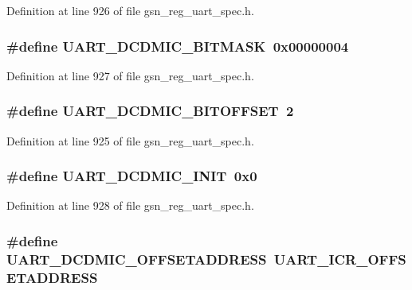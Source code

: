 Definition at line 926 of file gsn\_\-reg\_\-uart\_\-spec.h.

\hypertarget{a00575_aaee55abd39937707a37a6a304b7748fd}{
\subsubsection[{UART\_\-DCDMIC\_\-BITMASK}]{\setlength{\rightskip}{0pt plus 5cm}\#define UART\_\-DCDMIC\_\-BITMASK~0x00000004}}
\label{a00575_aaee55abd39937707a37a6a304b7748fd}


Definition at line 927 of file gsn\_\-reg\_\-uart\_\-spec.h.

\hypertarget{a00575_a1347a66d096cfc867a9771137c5c56b4}{
\subsubsection[{UART\_\-DCDMIC\_\-BITOFFSET}]{\setlength{\rightskip}{0pt plus 5cm}\#define UART\_\-DCDMIC\_\-BITOFFSET~2}}
\label{a00575_a1347a66d096cfc867a9771137c5c56b4}


Definition at line 925 of file gsn\_\-reg\_\-uart\_\-spec.h.

\hypertarget{a00575_a82d1a36e4570cdfd32fee2c5029bfda8}{
\subsubsection[{UART\_\-DCDMIC\_\-INIT}]{\setlength{\rightskip}{0pt plus 5cm}\#define UART\_\-DCDMIC\_\-INIT~0x0}}
\label{a00575_a82d1a36e4570cdfd32fee2c5029bfda8}


Definition at line 928 of file gsn\_\-reg\_\-uart\_\-spec.h.

\hypertarget{a00575_add9fb76bd02bfdd4b4f52d5c8df33c16}{
\subsubsection[{UART\_\-DCDMIC\_\-OFFSETADDRESS}]{\setlength{\rightskip}{0pt plus 5cm}\#define UART\_\-DCDMIC\_\-OFFSETADDRESS~UART\_\-ICR\_\-OFFSETADDRESS}}
\label{a00575_add9fb76bd02bfdd4b4f52d5c8df33c16}


